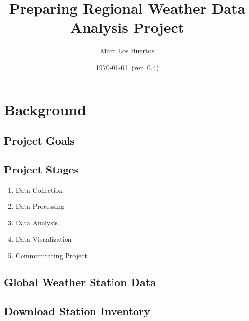 \documentclass{article}\usepackage[]{graphicx}\usepackage[]{xcolor}
\title{Preparing Regional Weather Data Analysis Project}
\author{Marc Los Huertos}
\date{\today~(ver. 0.4)} %
\begin{document}
\section{Background}

\subsection{Project Goals}

\subsection{Project Stages}

\begin{enumerate}
  \item Data Collection
  \item Data Processing
  \item Data Analysis
  \item Data Visualization
  \item Communicating Project
\end{enumerate}


\subsection{Global Weather Station Data}

\subsection{Download Station Inventory}
\end{document}
